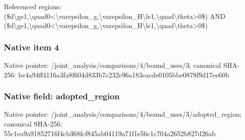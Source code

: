 \documentclass[10pt,a4paper]{article}
\begin{document}
\begingroup\raggedright\sloppy Referenced regions:\allowbreak{} (\$d\textbackslash{}ge1,\allowbreak{}\textbackslash{}quad0<\textbackslash{}varepsilon\_\allowbreak{}g,\allowbreak{}\textbackslash{}varepsilon\_\allowbreak{}H\textbackslash{}le1,\allowbreak{}\textbackslash{}quad\textbackslash{}theta>0\$) AND (\$d\textbackslash{}ge1,\allowbreak{}\textbackslash{}quad0<\textbackslash{}varepsilon\_\allowbreak{}g,\allowbreak{}\textbackslash{}varepsilon\_\allowbreak{}H\textbackslash{}le1,\allowbreak{}\textbackslash{}quad\textbackslash{}theta>0\$)\par\endgroup

\subsubsection{Native item 4}
Native pointer: /joint\_\allowbreak{}analysis/comparisons/4/bound\_\allowbreak{}uses/3; canonical SHA-256: bc4a94ff4116a3fa8f604d833b7c232e96a183cacde0105bbe0878f9d17ee60b

\subsubsection{Native field: adopted\_\allowbreak{}region}
Native pointer: /joint\_\allowbreak{}analysis/comparisons/4/bound\_\allowbreak{}uses/3/adopted\_\allowbreak{}region; canonical SHA-256: 55c1ea9a91852716f4cb368fcf845ab04119a71f1e56c1c704a2652b827d26ab
\end{document}
